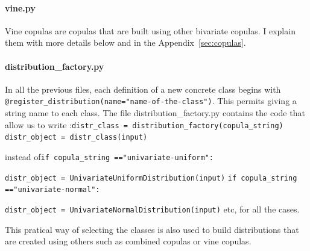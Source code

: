 \documentclass{article}
\begin{document}
	 
	 \paragraph{vine.py}
	 Vine copulas are copulas that are built using other bivariate copulas. I explain them with more details below and in the Appendix~\ref{sec:copulas}.
	 
	\paragraph{distribution\_factory.py}
	 
	 In all the previous files, each definition of a new concrete class begins with \texttt{@register\_distribution(name="name-of-the-class")}. This permits giving a string name to each class. The file distribution\_factory.py contains the code that allow us to write :\newline \texttt{distr\_class = distribution\_factory(copula\_string)}\newline
    \texttt{distr\_object = distr\_class(input)}\newline
   
     instead of\newline\texttt{if copula\_string =="univariate-uniform":}
    
    \texttt{distr\_object = UnivariateUniformDistribution(input)} \newline
    \texttt{if copula\_string =="univariate-normal":}
    
    \texttt{distr\_object = UnivariateNormalDistribution(input)} \newline etc, for all the cases. \newline
    
    This pratical way of selecting the classes is also used to build distributions that are created using others such as combined copulas or vine copulas.
	 
\end{document}

